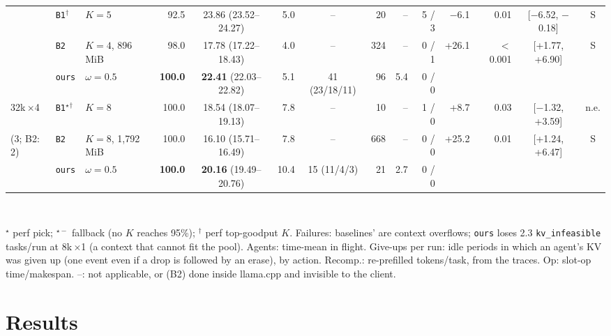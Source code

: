 \documentclass[conference]{IEEEtran}
\newcommand{\K}{$K$}
\newcommand{\x}{$\times$}
\newcommand{\pick}{$^\star$}
\newcommand{\pickf}{$^{\star-}$}
\newcommand{\topk}{$^\dagger$}
\newcommand{\cfg}[1]{\texttt{#1}}
\begin{document}
\begin{table}[!t]
\begin{tabular}{@{}lllrcrcrrrrrcc@{}}
     & \cfg{B1}\topk & $K{=}5$ & 92.5 & 23.86 (23.52--24.27) & 5.0 & -- & 20 & -- &
      5 / 3 & $-$6.1 & 0.01 & [$-$6.52, $-$0.18] & S \\
     & \cfg{B2} & $K{=}4$, 896\,MiB & 98.0 & 17.78 (17.22--18.43) & 4.0 & -- & 324 & -- & 0 / 1 &
      +26.1 & $<$0.001 & [+1.77, +6.90] & S \\
     & \cfg{ours} & $\omega{=}0.5$ & \textbf{100.0} & \textbf{22.41} (22.03--22.82) & 5.1 &
      41 (23/18/11) & 96 & 5.4 & 0 / 0 & & & & \\
    \midrule
    32k\,\x4 & \cfg{B1}\pick\topk & $K{=}8$ & 100.0 & 18.54 (18.07--19.13) & 7.8 & -- & 10 & -- & 1 / 0 &
      +8.7 & 0.03 & [$-$1.32, +3.59] & n.e. \\
    (3; B2: 2) & \cfg{B2} & $K{=}8$, 1,792\,MiB & 100.0 & 16.10 (15.71--16.49) & 7.8 & -- & 668 & -- & 0 / 0
      & +25.2 & 0.01 & [+1.24, +6.47] & S \\
     & \cfg{ours} & $\omega{=}0.5$ & \textbf{100.0} & \textbf{20.16} (19.49--20.76) & 10.4 &
      15 (11/4/3) & 21 & 2.7 & 0 / 0 & & & & \\
    \bottomrule
  \end{tabular}\\[2pt]
  \parbox{\textwidth}{\raggedright\scriptsize \pick{} perf pick; \pickf{} fallback (no \K{} reaches 95\%);
  \topk{} perf top-goodput \K. Failures: baselines' are context overflows; \cfg{ours} loses 2.3
  \texttt{kv\_infeasible} tasks/run at 8k\,\x1 (a context that cannot fit the pool). Agents: time-mean in
  flight. Give-ups per run: idle periods in which an agent's KV was given up (one event even if a drop
  is followed by an erase), by action. Recomp.: re-prefilled tokens/task, from the traces. Op: slot-op
  time/makespan. --: not applicable, or (B2) done inside llama.cpp and invisible to the client.}
\end{table}

\section{Results}\label{sec:results}
\end{document}
